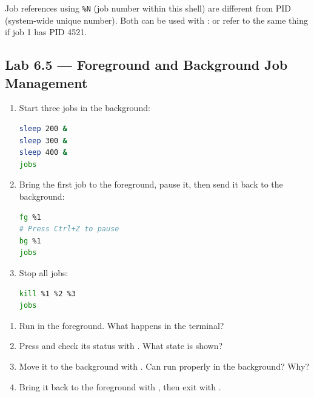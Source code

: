 \begin{notebox}
  Job references using \texttt{\%N} (job number within this shell) are
  different from PID (system-wide unique number). Both can be used with
  :  or  refer to the same thing if
  job 1 has PID 4521.
\end{notebox}

\subsection*{Lab 6.5 --- Foreground and Background Job Management}

\begin{enumerate}
  \item Start three jobs in the background:
\begin{lstlisting}[language=bash, caption={Creating three background jobs}]
sleep 200 &
sleep 300 &
sleep 400 &
jobs
\end{lstlisting}

  \item Bring the first job to the foreground, pause it, then send it back
    to the background:
\begin{lstlisting}[language=bash, caption={Moving a job between foreground and background}]
fg %1
# Press Ctrl+Z to pause
bg %1
jobs
\end{lstlisting}

  \item Stop all jobs:
\begin{lstlisting}[language=bash, caption={Stopping all jobs}]
kill %1 %2 %3
jobs
\end{lstlisting}
\end{enumerate}

\begin{exercisebox}[6.5]
  \begin{enumerate}
    \item Run  in the foreground. What happens in the terminal?
    \item Press  and check its status with .
      What state is shown?
    \item Move it to the background with . Can  run
      properly in the background? Why?
    \item Bring it back to the foreground with , then exit with
      .
  \end{enumerate}
\end{exercisebox}

